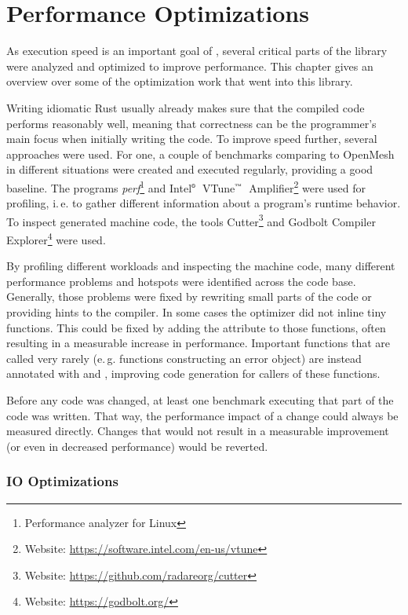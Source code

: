 \newpage
\section{Performance Optimizations}

As execution speed is an important goal of , several critical parts of the library were analyzed and optimized to improve performance.
This chapter gives an overview over some of the optimization work that went into this library.

Writing idiomatic Rust usually already makes sure that the compiled code performs reasonably well, meaning that correctness can be the programmer's main focus when initially writing the code.
To improve speed further, several approaches were used.
For one, a couple of benchmarks comparing  to OpenMesh in different situations were created and executed regularly, providing a good baseline.
The programs \emph{perf}\footnote{Performance analyzer for Linux} and Intel$^\text{\tiny ®}$~VTune$^\text{\tiny ™}$~Amplifier\footnote{Website: \url{https://software.intel.com/en-us/vtune}} were used for profiling, i.\,e. to gather different information about a program's runtime behavior.
To inspect generated machine code, the tools Cutter\footnote{Website: \url{https://github.com/radareorg/cutter}} and Godbolt Compiler Explorer\footnote{Website: \url{https://godbolt.org/}} were used.

By profiling different workloads and inspecting the machine code, many different performance problems and hotspots were identified across the code base.
Generally, those problems were fixed by rewriting small parts of the code or providing hints to the compiler.
In some cases the optimizer did not inline tiny functions.
This could be fixed by adding the  attribute to those functions, often resulting in a measurable increase in performance.
Important functions that are called very rarely (e.\,g. functions constructing an error object) are instead annotated with  and \code{#[cold]}, improving code generation for callers of these functions.

Before any code was changed, at least one benchmark executing that part of the code was written.
That way, the performance impact of a change could always be measured directly.
Changes that would not result in a measurable improvement (or even in decreased performance) would be reverted.


\subsubsection*{IO Optimizations}

